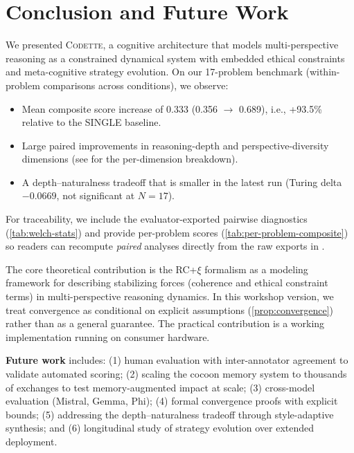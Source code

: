 \documentclass[11pt,a4paper]{article}
\newcommand{\codette}{\textsc{Codette}}
\begin{document}
\section{Conclusion and Future Work}
\label{sec:conclusion}

We presented \codette{}, a cognitive architecture that models multi-perspective reasoning as a constrained dynamical system with embedded ethical constraints and meta-cognitive strategy evolution. On our 17-problem benchmark (within-problem comparisons across conditions), we observe:

\begin{itemize}[nosep]
  \item Mean composite score increase of 0.333 (0.356 $\to$ 0.689), i.e., +93.5\% relative to the SINGLE baseline.
  \item Large paired improvements in reasoning-depth and perspective-diversity dimensions (see  for the per-dimension breakdown).
  \item A depth--naturalness tradeoff that is smaller in the latest run (Turing delta $-0.0669$, not significant at $N=17$).
\end{itemize}

For traceability, we include the evaluator-exported pairwise diagnostics (\cref{tab:welch-stats}) and provide per-problem scores (\cref{tab:per-problem-composite}) so readers can recompute \emph{paired} analyses directly from the raw exports in .

The core theoretical contribution is the RC+$\xi$ formalism as a modeling framework for describing stabilizing forces (coherence and ethical constraint terms) in multi-perspective reasoning dynamics. In this workshop version, we treat convergence as conditional on explicit assumptions (\cref{prop:convergence}) rather than as a general guarantee. The practical contribution is a working implementation running on consumer hardware.

\textbf{Future work} includes: (1) human evaluation with inter-annotator agreement to validate automated scoring; (2) scaling the cocoon memory system to thousands of exchanges to test memory-augmented impact at scale; (3) cross-model evaluation (Mistral, Gemma, Phi); (4) formal convergence proofs with explicit bounds; (5) addressing the depth--naturalness tradeoff through style-adaptive synthesis; and (6) longitudinal study of strategy evolution over extended deployment.
\end{document}
